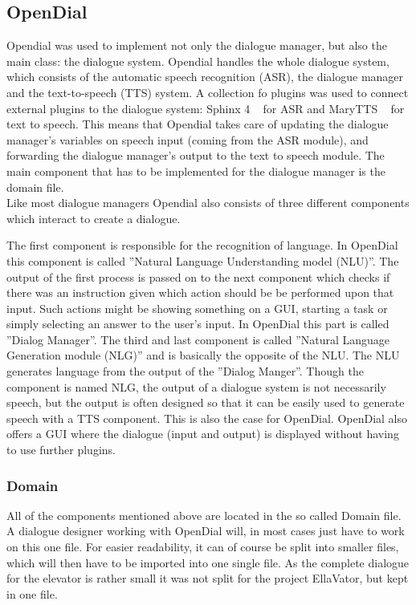 \documentclass[a4paper, 12pt]{article}
\begin{document}
\subsection{OpenDial}
\label{sec:opendial}
Opendial was used to implement not only the dialogue manager,  but also the main class: the dialogue system.
Opendial handles the whole dialogue system, which consists of the automatic speech recognition (ASR), the dialogue manager and the text-to-speech (TTS) system.
A collection fo plugins was used to connect external plugins to the dialogue system: Sphinx 4 ~\cite{Walker:2004:SFO:1698193} for ASR and MaryTTS ~\cite{marytts} for text to speech.
This means that Opendial takes care of updating the dialogue manager's variables on speech input (coming from the ASR module), and forwarding the dialogue manager's output to the text to speech module.
The main component that has to be implemented for the dialogue manager is the domain file. \\
\indent Like most dialogue managers Opendial also consists of three different components which interact to create a dialogue.

The first component is responsible for the recognition of language.
In OpenDial this component is called ”Natural Language Understanding model (NLU)”.
The output of the first process is passed on to the next component which checks if there was an instruction given which action should be be performed upon that input.
Such actions might be showing something on a GUI, starting a task or simply selecting an answer to the user's input.
In OpenDial this part is called ”Dialog Manager”.
The third and last component is called ”Natural Language Generation module (NLG)” and is basically the opposite of the NLU.
The NLU generates language from the output of the ”Dialog Manger”.
Though the component is named NLG, the output of a dialogue system is not necessarily speech, but the output is often designed so that it can be easily used to generate speech with a TTS component.
This is also the case for OpenDial.
OpenDial also offers a GUI where the dialogue (input and output) is displayed without having to use further plugins.

\subsubsection{Domain}

All of the components mentioned above are located in the so called Domain file.
A dialogue designer working with OpenDial will, in most cases just have to work on this one file.
For easier readability, it can of course be split into smaller files, which will then have to be imported into one single file.
As the complete dialogue for the elevator is rather small it was not split for the project EllaVator, but kept in one file. \newline
\end{document}
